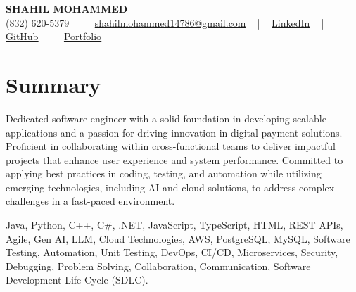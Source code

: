 \documentclass[letterpaper,10pt]{article}
\begin{document}
\begin{center}
    {\fontsize{14pt}{12pt}\selectfont \textbf{\MakeUppercase{Shahil Mohammed}}}\\ \vspace{2pt}
    \fontsize{10pt}{12pt}\selectfont (832) 620-5379 ~ | ~ \href{mailto:shahilmohammed14786@gmail.com}{shahilmohammed14786@gmail.com} ~ | ~  
    \href{https://www.linkedin.com/in/shahil-mohammed-9652931a1/}{\color{blue}\underline{LinkedIn}}  ~ | ~ 
    \href{https://github.com/freakbeast14}{\color{blue}\underline{GitHub}} ~ | ~ 
    \href{https://shahil-mohammed.netlify.app/}{\color{blue}\underline{Portfolio}}
    \vspace{-8pt}
\end{center}

\section{Summary}
\vspace{-2pt}\fontsize{8pt}{9pt}\selectfont
Dedicated software engineer with a solid foundation in developing scalable applications and a passion for driving innovation in digital payment solutions. Proficient in collaborating within cross-functional teams to deliver impactful projects that enhance user experience and system performance. Committed to applying best practices in coding, testing, and automation while utilizing emerging technologies, including AI and cloud solutions, to address complex challenges in a fast-paced environment. 
\vspace{-5pt}
 
{\fontsize{1pt}{1pt}\selectfont\color{white}
Java, Python, C++, C#, .NET, JavaScript, TypeScript, HTML, REST APIs, Agile, Gen AI, LLM, Cloud Technologies, AWS, PostgreSQL, MySQL, Software Testing, Automation, Unit Testing, DevOps, CI/CD, Microservices, Security, Debugging, Problem Solving, Collaboration, Communication, Software Development Life Cycle (SDLC).
}
\vspace{-8pt}

\vspace{-2pt}
\end{document}

